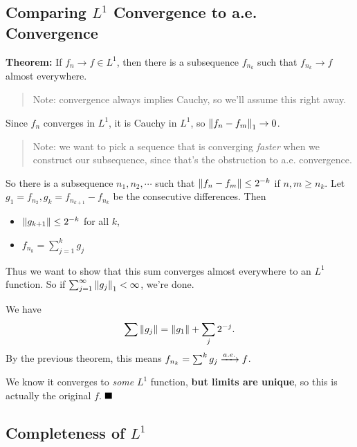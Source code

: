 \hypertarget{comparing-l1-convergence-to-a.e.-convergence}{%
\subsection{\texorpdfstring{Comparing \(L^1\) Convergence to a.e.
Convergence}{Comparing L\^{}1 Convergence to a.e. Convergence}}\label{comparing-l1-convergence-to-a.e.-convergence}}

\textbf{Theorem:} If \(f_n \to f \in L^1\), then there is a subsequence
\(f_{n_k}\) such that \(f_{n_k} \to f\) almost everywhere.

\begin{quote}
Note: convergence always implies Cauchy, so we'll assume this right
away.
\end{quote}

Since \(f_n\) converges in \(L^1\), it is Cauchy in \(L^1\), so
\({\left\lVert {f_n - f_m} \right\rVert}_1 \to 0\).

\begin{quote}
Note: we want to pick a sequence that is converging \emph{faster} when
we construct our subsequence, since that's the obstruction to a.e.
convergence.
\end{quote}

So there is a subsequence \(n_1, n_2, \cdots\) such that
\({\left\lVert {f_n - f_m} \right\rVert} \leq 2^{-k}\) if \(n, m \geq n_k\). Let
\(g_1 = f_{n_2}, g_k = f_{n_{k+1}} - f_{n_k}\) be the consecutive
differences. Then

\begin{itemize}
\tightlist
\item
  \({\left\lVert {g_{k+1}} \right\rVert} \leq 2^{-k}\) for all \(k\),
\item
  \(f_{n_k} = \sum_{j=1}^{k} g_j\)
\end{itemize}

Thus we want to show that this sum converges almost everywhere to an
\(L^1\) function. So if \(\sum_{j=1}^\infty {\left\lVert {g_j} \right\rVert}_1 < \infty\),
we're done.

We have
\begin{align*}
\sum {\left\lVert {g_j} \right\rVert} = {\left\lVert {g_1} \right\rVert} + \sum_j 2^{-j}
.\end{align*} By the previous theorem, this means
\(f_{n_k} = \sum^k g_j \xrightarrow{a.e.} f\).

We know it converges to \emph{some} \(L^1\) function, \textbf{but limits
are unique}, so this is actually the original \(f\). \(\qed\)

\hypertarget{completeness-of-l1}{%
\subsection{\texorpdfstring{Completeness of
\(L^1\)}{Completeness of L\^{}1}}\label{completeness-of-l1}}

